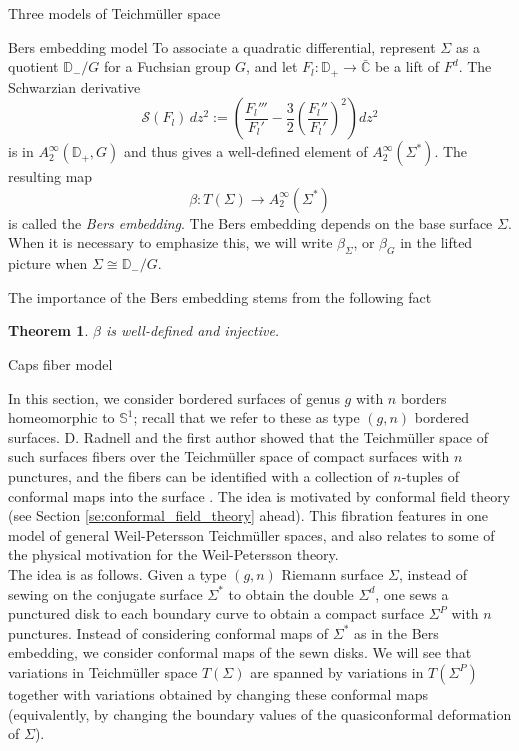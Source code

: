 \documentclass[12pt]{amsart}
\newcommand{\disk}{\ensuremath{\mathbb{D}} } %
\newcommand{\sphere}{\bar{\Bbb{C}}} %
\newcommand{\riem}{\Sigma}  %
\renewcommand{\Bbb}[1]{\ensuremath{\mathbb{#1}}}
\theoremstyle{plain}
\newtheorem{theorem}{Theorem}[section]
\theoremstyle{definition}
\theoremstyle{remark}
\numberwithin{equation}{section} %
\numberwithin{figure}{section} %
\begin{document}
\begin{section}{Three models of Teichm\"uller space}
\begin{subsection}{Bers embedding model}
   To associate a quadratic differential, represent $\riem$ as a quotient $\disk_-/G$ for a Fuchsian group $G$, and let $F_{l}:\disk_+\rightarrow \sphere$ be a lift of $F^d$. 
   The Schwarzian derivative 
   \[\mathcal{S}(F_l) \, dz^2:=  \left( \frac{F_l'''}{F_l'} - \frac{3}{2} \left( \frac{F_l''}{F_l'} \right)^2 \right) dz^2     \]
   is in $A^\infty_2(\disk_+,G)$ and thus gives a well-defined element of $A^\infty_2(\riem^*)$.  The resulting map 
   \[  \beta: T(\riem) \rightarrow A_2^\infty(\riem^*)  \]
   is called the {\it Bers embedding}.
   The Bers embedding depends on the base surface $\riem$. When it is necessary to emphasize this, we will write $\beta_\riem$, or $\beta_G$ in the lifted picture when $\riem \cong \disk_-/G$. 
   
   The importance of the Bers embedding stems from the following fact
   \begin{theorem}
     $\beta$ is well-defined and injective.
   \end{theorem}  
 
 \end{subsection}
 \begin{subsection}{Caps fiber model}  \label{se:fiber_model_general_description}


   In this section, we consider bordered surfaces of genus $g$ with $n$ borders homeomorphic to $\mathbb{S}^1$; recall that we refer to these as type $(g,n)$ bordered surfaces.  
D. Radnell and the first author showed that the Teichm\"uller space of such surfaces fibers over the Teichm\"uller space of compact surfaces with $n$ punctures, and the fibers can be identified with a collection of $n$-tuples of conformal maps into the surface \cite{RadnellSchippers_fiber}. The idea is motivated by conformal field theory (see Section \ref{se:conformal_field_theory} ahead). This fibration features in one model of general Weil-Petersson Teichm\"uller spaces, and also relates to some of the physical motivation for the Weil-Petersson theory.\\

The idea is as follows. Given a type $(g,n)$ Riemann surface $\riem$, instead of sewing on the conjugate surface $\riem^*$ to obtain the double $\riem^d$, one sews a punctured disk to each boundary curve to obtain a compact surface $\riem^P$ with $n$ punctures.  Instead of considering conformal maps of $\riem^*$ as in the Bers embedding, we consider conformal maps of the sewn disks. We will see that variations in Teichm\"uller space $T(\riem)$ are spanned by variations in $T(\riem^P)$ together with variations obtained by changing these conformal maps (equivalently, by changing the boundary values of the quasiconformal deformation of $\riem$).\\ 


\end{subsection}
\end{section}
\end{document}
